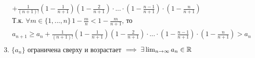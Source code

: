 {\begin{mcproof}
\begin{equation*}
\begin{split}
    & + \frac{1}{(n + 1)!} \left(1 - \frac{1}{n + 1}\right) \left(1 - \frac{2}{n + 1}\right) \cdot ... \cdot \left(1 - \frac{n - 1}{n + 1}\right) \cdot \left(1 - \frac{n}{n + 1}\right) \\
    & \text{Т.к. } \forall m \in \{ 1, ..., n \} \, 1 - \frac{m}{n} < 1 - \frac{m}{n + 1} \text{, то } \\
    & a_{n + 1} \ge a_{n} + \frac{1}{(n + 1)!} \left(1 - \frac{1}{n + 1}\right) \left(1 - \frac{2}{n + 1}\right) \cdot ... \cdot \left(1 - \frac{n - 1}{n + 1}\right) \cdot \left(1 - \frac{n}{n + 1}\right) 
        > a_n \\
\end{split}
\end{equation*}
    3. $ \{ a_n \} $ ограничена сверху и возрастает $ \implies \exists \lim_{n\to\infty} a_n \in \Rset $
\end{mcproof}
}
